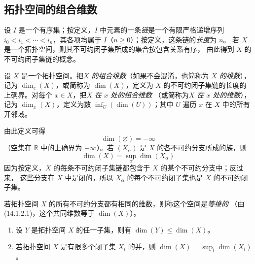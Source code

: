 \setcounter{subsection}{0}
\subsection{拓扑空间的组合维数}
\label{subsection:0.14.1-fr}

\begin{env}[14.1.1]
\label{0.14.1.1-fr}
设 $I$ 是一个有序集；按定义，$I$ 中元素的一条\emph{链}是一个有限严格递增序列
$i_0<i_1<\cdots<i_n$，其各项均属于 $I$（$n\geq 0$）；按定义，这条链的\emph{长度}为 $n$。
若 $X$ 是一个拓扑空间，则其不可约闭子集所成的集合按包含关系有序，
由此得到 $X$ 的不可约闭子集链的概念。
\end{env}

\begin{definition}[14.1.2]
\label{0.14.1.2-fr}
设 $X$ 是一个拓扑空间。把\emph{$X$ 的组合维数}（如果不会混淆，也简称为
\emph{$X$ 的维数}），记为 $\dim_c(X)$，或简称为 $\dim(X)$，定义为 $X$
的不可约闭子集链的长度的上确界。对每个 $x\in X$，把\emph{$X$ 在 $x$ 处的组合维数}
（或简称为\emph{$X$ 在 $x$ 处的维数}），记为 $\dim_x(X)$，定义为数
$\inf_U(\dim(U))$；其中 $U$ 遍历 $x$ 在 $X$ 中的所有开邻域。
\end{definition}

由此定义可得
\[
  \dim(\varnothing)=-\infty
\]
（空集在 $\overline{\mathbb R}$ 中的上确界为 $-\infty$）。若 $(X_\alpha)$ 是
$X$ 的各不可约分支所成的族，则
\[
  \dim(X)=\sup_\alpha\dim(X_\alpha)
  \tag{14.1.2.1}\label{0.14.1.2.1-fr}
\]
因为按定义，$X$ 的每条不可约闭子集链都包含于 $X$ 的某个不可约分支中；反过来，
这些分支在 $X$ 中是闭的，所以 $X_\alpha$ 的每个不可约闭子集也是 $X$ 的不可约闭子集。

\begin{definition}[14.1.3]
\label{0.14.1.3-fr}
若拓扑空间 $X$ 的所有不可约分支都有相同的维数，则称这个空间是\emph{等维的}
（由 (14.1.2.1)，这个共同维数等于 $\dim(X)$）。
\end{definition}

\begin{proposition}[14.1.4]
\label{0.14.1.4-fr}
\begin{enumerate}
  \item[\rm(i)] 设 $Y$ 是拓扑空间 $X$ 的任一子集，则有
  $\dim(Y)\leq\dim(X)$。
  \item[\rm(ii)] 若拓扑空间 $X$ 是有限多个闭子集 $X_i$ 的并，则
  $\dim(X)=\sup_i\dim(X_i)$。
\end{enumerate}
\end{proposition}

